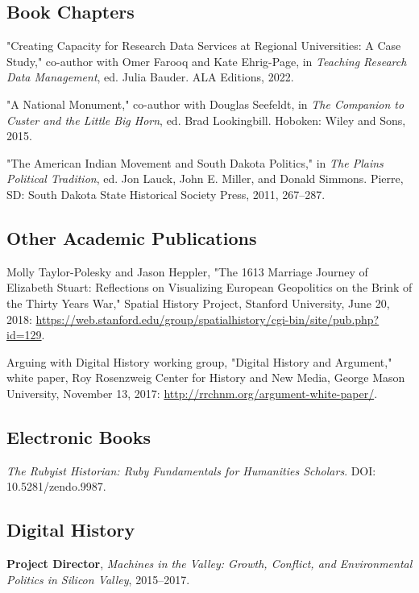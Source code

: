 \documentclass[10pt]{article}
\begin{document}
\subsection{Book Chapters}

"Creating Capacity for Research Data Services at Regional Universities: A Case Study," co-author with Omer Farooq and Kate Ehrig-Page, in \textit{Teaching Research Data Management}, ed. Julia Bauder. ALA Editions, 2022.

"A National Monument," co-author with Douglas Seefeldt, in \textit{The Companion to Custer and the Little Big Horn}, ed. Brad Lookingbill. Hoboken: Wiley and Sons, 2015.

"The American Indian Movement and South Dakota Politics," in \textit{The Plains Political Tradition}, ed. Jon Lauck, John E. Miller, and Donald Simmons. Pierre, SD: South Dakota State Historical Society Press, 2011, 267--287.

\subsection{Other Academic Publications}

Molly Taylor-Polesky and Jason Heppler, "The 1613 Marriage Journey of Elizabeth Stuart: Reflections on Visualizing European Geopolitics on the Brink of the Thirty Years War," Spatial History Project, Stanford University, June 20, 2018: \url{https://web.stanford.edu/group/spatialhistory/cgi-bin/site/pub.php?id=129}.

Arguing with Digital History working group, "Digital History and Argument," white paper, Roy Rosenzweig Center for History and New Media, George Mason University, November 13, 2017: \url{http://rrchnm.org/argument-white-paper/}.

\subsection{Electronic Books}

\textit{The Rubyist Historian: Ruby Fundamentals for Humanities Scholars}. DOI: 10.5281/zendo.9987.

\subsection{Digital History}

\textbf{Project Director}, \textit{Machines in the Valley: Growth, Conflict, and Environmental Politics in Silicon Valley}, 2015--2017.
\end{document}

